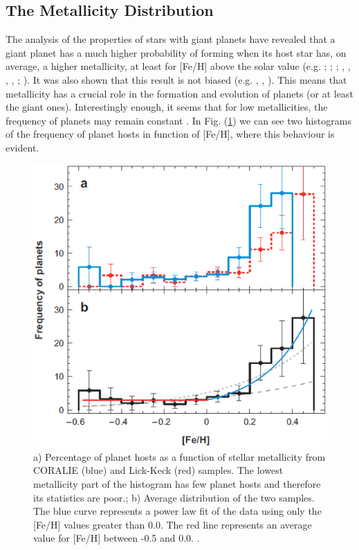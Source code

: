 \documentclass[dvips,12pt,a4paper]{report}
\begin{document}
\subsection {The Metallicity Distribution} 
\label{metal}
The analysis of the properties of stars with giant planets have revealed that a giant planet has a much higher probability of forming when its host star has, on average, a higher metallicity, at least for [Fe/H] above the solar value (e.g. \citeauthor{Gonzalez-1998} \citeyear{Gonzalez-1998}; \citeauthor{Gonzalez-2001} \citeyear{Gonzalez-2001}; \citeauthor{Laws-2003} \citeyear{Laws-2003}; \citeauthor{Santos-2001a} \citeyear{Santos-2001b}, \citeyear{Santos-2001a}, \citeyear{Santos-2003}, \citeyear{Santos-2004b}, \citeyear{Santos-2005a}; \citeauthor{Fischer-2005} \citeyear{Fischer-2005}). It was also shown that this result is not biased  (e.g. \citeauthor{Santos-2003} \citeyear{Santos-2003}, \citeyear{Santos-2004b}, \citeauthor{Fischer-2005} \citeyear{Fischer-2005}). This means that metallicity has a crucial role in the formation and evolution of planets (or at least the giant ones). Interestingly enough, it seems that for low metallicities, the frequency of planets may remain constant \citep{Santos-2004b}. In Fig. (\ref{histfeh}) we can see two histograms of the frequency of planet hosts in function of [Fe/H], where this behaviour is evident. 

\begin{figure}[h]
\centering
\includegraphics[height=10 cm]{pics/fehhist}
\caption[Histograms of Frequency of planets with metallicity ]{a) Percentage of planet hosts as a function of stellar metallicity from CORALIE (blue) and Lick-Keck (red) samples. The lowest metallicity part of the histogram has few planet hosts and therefore its statistics are poor.; b) Average distribution of the two samples. The blue curve represents a power law fit of the data using only the [Fe/H] values greater than 0.0. The red line represents an average value for [Fe/H] between -0.5 and 0.0.  \citep{Udry-2007}.}
\label{histfeh}
\end{figure}
\end{document}
